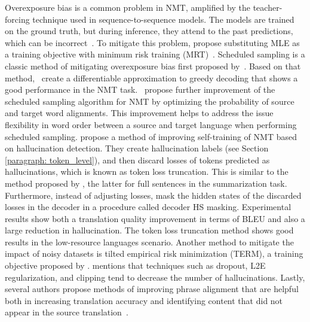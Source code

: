 Overexposure bias is a common problem in NMT, amplified by the teacher-forcing technique used in sequence-to-sequence models. The models are trained on the ground truth, but during inference, they attend to the past predictions, which can be incorrect~.
To mitigate this problem,  propose substituting MLE as a training objective with minimum risk training (MRT)~. 
Scheduled sampling is a classic method of mitigating overexposure bias first proposed by~. Based on that method,~ create a differentiable approximation to greedy decoding that shows a good performance in the NMT task.~ propose further improvement of the scheduled sampling algorithm for NMT by optimizing the probability of source and target word alignments. This improvement helps to address the issue flexibility in word order between a source and target language when performing scheduled sampling.
 propose a method of improving self-training of NMT based on hallucination detection. They create hallucination labels (see Section \ref{paragraph: token_level}), and then discard losses of tokens predicted as hallucinations, which is known as token loss truncation. This is similar to the method proposed by , the latter for full sentences in the summarization task. Furthermore, instead of adjusting losses,  mask the hidden states of the discarded losses in the decoder in a procedure called decoder HS masking. Experimental results show both a translation quality improvement in terms of BLEU and also a large reduction in hallucination. The token loss truncation method shows good results in the low-resource languages scenario.
Another method to mitigate the impact of noisy datasets is tilted empirical risk minimization (TERM), a training objective proposed by .
 mentions that techniques such as dropout, L2E regularization, and clipping tend to decrease the number of hallucinations. Lastly, several authors propose methods of improving phrase alignment that are helpful both in increasing translation accuracy and identifying content that did not appear in the source translation~.

